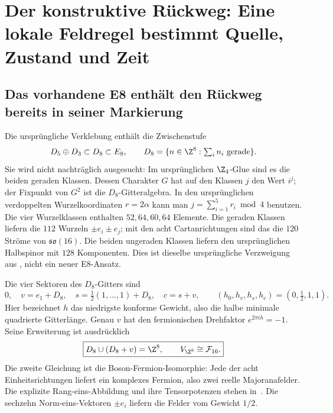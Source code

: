\section{Der konstruktive Rückweg: Eine lokale Feldregel bestimmt Quelle, Zustand und Zeit}\label{sec:inverseorigin}


\subsection{Das vorhandene E8 enthält den Rückweg bereits in seiner Markierung}
Die ursprüngliche Verklebung enthält die Zwischenstufe
\begin{equation}
D_5\oplus D_3\subset D_8\subset E_8,
\qquad D_8=\{n\in\Z^8:\textstyle\sum_i n_i\text{ gerade}\}.
\end{equation}
Sie wird nicht nachträglich ausgesucht: Im ursprünglichen $\Z_4$-Glue sind es die beiden geraden Klassen. Dessen Charakter $G$ hat auf den Klassen $j$ den Wert $i^j$; der Fixpunkt von $G^2$ ist die $D_8$-Gitteralgebra. In den ursprünglichen verdoppelten Wurzelkoordinaten $r=2\alpha$ kann man $j=\sum_{i=1}^5r_i\bmod4$ benutzen. Die vier Wurzelklassen enthalten $52,64,60,64$ Elemente. Die geraden Klassen liefern die $112$ Wurzeln $\pm e_i\pm e_j$; mit den acht Cartanrichtungen sind das die $120$ Ströme von $\mathfrak{so}(16)$. Die beiden ungeraden Klassen liefern den ursprünglichen Halbspinor mit $128$ Komponenten. Dies ist dieselbe ursprüngliche Verzweigung aus , nicht ein neuer E8-Ansatz.

Die vier Sektoren des $D_8$-Gitters sind
\begin{equation}
0,\quad v=e_1+D_8,\quad s=\tfrac12(1,\ldots,1)+D_8,\quad c=s+v,
\qquad (h_0,h_v,h_s,h_c)=(0,\tfrac12,1,1).
\end{equation}
Hier bezeichnet $h$ das niedrigste konforme Gewicht, also die halbe minimale quadrierte Gitterlänge. Genau $v$ hat den fermionischen Drehfaktor $e^{2\pi ih}=-1$. Seine Erweiterung ist ausdrücklich
\begin{equation}\label{eq:inverseZ8}
\boxed{D_8\cup(D_8+v)=\Z^8,\qquad V_{\Z^8}\cong\mathcal F_{16}.}
\end{equation}
Die zweite Gleichung ist die Boson-Fermion-Isomorphie: Jede der acht Einheitsrichtungen liefert ein komplexes Fermion, also zwei reelle Majoranafelder. Die explizite Rang-eins-Abbildung und ihre Tensorpotenzen stehen in~\cite{barronfermion}. Die sechzehn Norm-eins-Vektoren $\pm e_i$ liefern die Felder vom Gewicht $1/2$.

